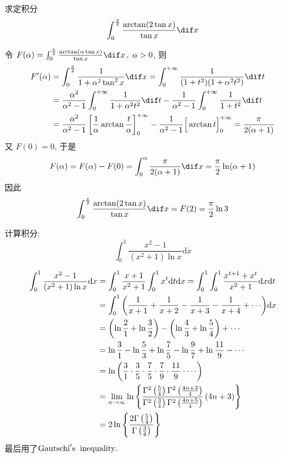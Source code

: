 \documentclass[color=green,titlestyle=hang]{elegantbook}%
\begin{document}
\begin{example}
求定积分\[\int_0^{\frac{\pi}{2}}\frac{\arctan(2\tan x)}{\tan x}\dif x\]
\end{example}\begin{solution}令 $F(\alpha)=\int_0^{\frac{\pi}{2}}\frac{\arctan(\alpha\tan x)}{\tan x}\dif x\,,\;\alpha>0$, 
则\begin{align*}
F'(\alpha)&=\int_0^{\frac{\pi}{2}}\frac{1}{1+\alpha^2\tan^2x}\dif x=\int_0^{+\infty}\frac{1}{(1+t^2)(1+\alpha^2t^2)}\dif t\\
&=\frac{\alpha^2}{\alpha^2-1}\int_0^{+\infty}\frac{1}{1+\alpha^2t^2}\dif t-\frac{1}{\alpha^2-1}\int_0^{+\infty}\frac{1}{1+t^2}\dif t\\
&=\frac{\alpha^2}{\alpha^2-1}\left[\frac{1}{\alpha}\arctan\frac{t}{\alpha}\right]_0^{+\infty}-\frac{1}{\alpha^2-1}\Big[\arctan t\Big]_0^{+\infty}=\frac{\pi}{2(\alpha+1)}
\end{align*}
又 $F(0)=0$, 于是
\[F(\alpha)=F(\alpha)-F(0)=\int_0^{\alpha}\frac{\pi}{2(\alpha+1)}\dif x=\frac{\pi}{2}\ln(\alpha+1)\]
因此\[\int_0^{\frac{\pi}{2}}\frac{\arctan(2\tan x)}{\tan x}\dif x=F(2)=\frac{\pi}{2}\ln3\]
\end{solution}

\begin{exercise}计算积分:~\begin{equation*}\int_0^1 {\frac{{{x^2} - 1}}{{\left( {{x^2} + 1} \right)\ln x}}}\textrm{d}x\end{equation*}
\end{exercise}\begin{solution}
\begin{align*}
\int_0^1 {\frac{{{x^2} - 1}}{{\left( {{x^2} + 1} \right)\ln x}}} {\rm{d}}x &= \int_0^1 {\frac{{x + 1}}{{{x^2} + 1}}} \int_0^1 {{x^t}{\rm{d}}t{\rm{d}}x}  = \int_0^1 {\int_0^1 {\frac{{{x^{t + 1}} + {x^t}}}{{{x^2} + 1}}{\rm{d}}x{\rm{d}}t} } \\
&= \int_0^1 {\left( {\frac{1}{{x + 1}} + \frac{1}{{x + 2}} - \frac{1}{{x + 3}} - \frac{1}{{x + 4}} +  \cdots } \right)} {\rm{d}}x \\
&= \left( {\ln \frac{2}{1} + \ln \frac{3}{2}} \right) - \left( {\ln \frac{4}{3} + \ln \frac{5}{4}} \right) +  \cdots \\
&= \ln \frac{3}{1} - \ln \frac{5}{3} + \ln \frac{7}{5} - \ln \frac{9}{7} + \ln \frac{{11}}{9} -\cdots  \\
&= \ln \left( {\frac{3}{1} \cdot \frac{3}{5} \cdot \frac{7}{5} \cdot \frac{7}{9} \cdot \frac{{11}}{9} \cdot  \cdots } \right)\\
&= \mathop {\lim }\limits_{n \to \infty } \ln \left\{ {\frac{{{\Gamma ^2}\left( {\frac{5}{4}} \right){\Gamma ^2}\left( {\frac{{4n + 3}}{4}} \right)}}{{{\Gamma ^2}\left( {\frac{3}{4}} \right){\Gamma ^2}\left( {\frac{{4n + 5}}{4}} \right)}}\left( {4n + 3} \right)} \right\} \\
&= 2\ln \left\{ {\frac{{2\Gamma \left( {\frac{5}{4}} \right)}}{{\Gamma \left( {\frac{3}{4}} \right)}}} \right\}
\end{align*}
最后用了${\rm{Gautschi}}'{\rm{s}}\;\;{\rm{inequality}}.$	
\end{solution}
\end{document}
